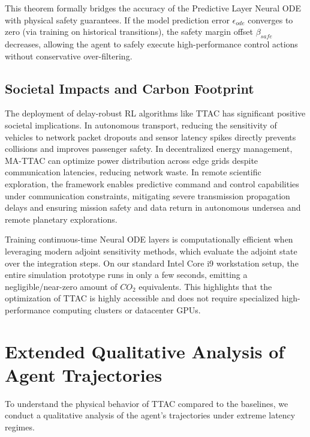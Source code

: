 \documentclass[manuscript, screen, review]{jair}
\begin{document}
This theorem formally bridges the accuracy of the Predictive Layer Neural ODE with physical safety guarantees. If the model prediction error $\epsilon_{ode}$ converges to zero (via training on historical transitions), the safety margin offset $\beta_{safe}$ decreases, allowing the agent to safely execute high-performance control actions without conservative over-filtering.

\subsection{Societal Impacts and Carbon Footprint}\label{app:sub_societal}
The deployment of delay-robust RL algorithms like TTAC has significant positive societal implications. In autonomous transport, reducing the sensitivity of vehicles to network packet dropouts and sensor latency spikes directly prevents collisions and improves passenger safety. In decentralized energy management, MA-TTAC can optimize power distribution across edge grids despite communication latencies, reducing network waste. In remote scientific exploration, the framework enables predictive command and control capabilities under communication constraints, mitigating severe transmission propagation delays and ensuring mission safety and data return in autonomous undersea and remote planetary explorations.

Training continuous-time Neural ODE layers is computationally efficient when leveraging modern adjoint sensitivity methods, which evaluate the adjoint state over the integration steps. On our standard Intel Core i9 workstation setup, the entire simulation prototype runs in only a few seconds, emitting a negligible/near-zero amount of $CO_2$ equivalents. This highlights that the optimization of TTAC is highly accessible and does not require specialized high-performance computing clusters or datacenter GPUs.

\section{Extended Qualitative Analysis of Agent Trajectories}\label{app:sec_qualitative}
To understand the physical behavior of TTAC compared to the baselines, we conduct a qualitative analysis of the agent's trajectories under extreme latency regimes.
\end{document}

